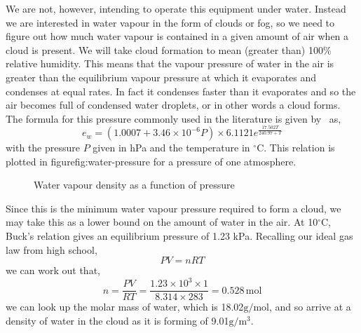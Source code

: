 We are not, however, intending to operate this equipment under
water. Instead we are interested in water vapour in the form of clouds
or fog, so we need to figure out how much water vapour is contained
in a given amount of air when a cloud is present. We will take cloud
formation to mean (greater than) 100\% relative humidity. This means
that the vapour pressure of water in the air is greater than the
equilibrium vapour pressure at which it evaporates and condenses at
equal rates. In fact it condenses faster than it evaporates and so the
air becomes full of condensed water droplets, or in other words a
cloud forms. The formula for this pressure commonly used in the
literature is given by~\cite{buck_new_1981} as,
\begin{equation}
  \label{eq:buck}
  e_w = (1.0007 + 3.46\times 10^{-6}P)\times 6.1121e^{\frac{17.502T}{240.97+T}}
\end{equation}
with the pressure $P$ given in hPa and the temperature in
$^\circ$C. This relation is plotted in figure{fig:water-pressure} for
a pressure of one atmosphere.
\begin{figure}[h]
  \centering
  \caption{Water vapour density as a function of pressure}
  \label{fig:water-pressure}
\end{figure}

Since this is the minimum water vapour pressure required to form a
cloud, we may take this as a lower bound on the amount of water in the
air. At 10$^\circ$C, Buck's relation gives an equilibrium pressure of
1.23 kPa. Recalling our ideal gas law from high school,
\begin{equation}
  \label{eq:ideal-gas}
  PV = nRT
\end{equation}
we can work out that,
\begin{equation*}
  n = \frac{PV}{RT} 
    = \frac{1.23\times 10^3 \times 1}
           {8.314 \times 283}
    = 0.528\, \text{mol}
\end{equation*}
we can look up the molar mass of water, which is
18.02$\text{g}/\text{mol}$, and so arrive at a density of water in the
cloud as it is forming of 9.01$\text{g}/\text{m}^3$.

